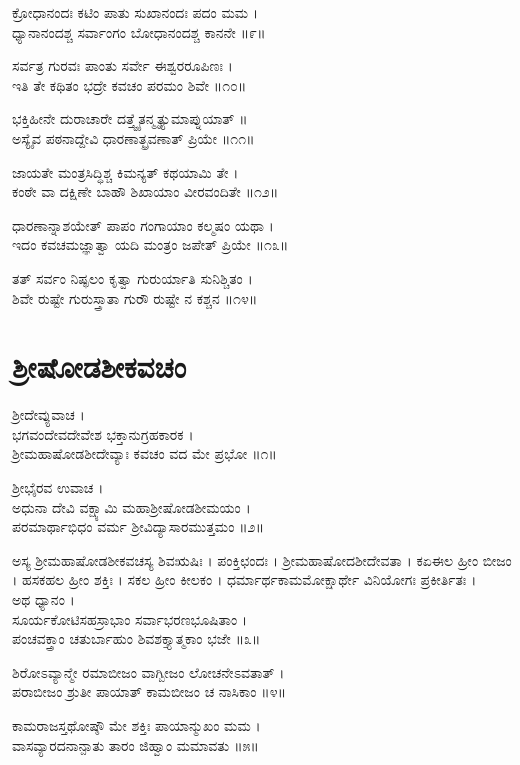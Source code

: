 ಕ್ರೋಧಾನಂದಃ ಕಟಿಂ ಪಾತು ಸುಖಾನಂದಃ ಪದಂ ಮಮ ।\\
ಧ್ಯಾನಾನಂದಶ್ಚ ಸರ್ವಾಂಗಂ ಬೋಧಾನಂದಶ್ಚ ಕಾನನೇ ॥೯॥

ಸರ್ವತ್ರ ಗುರವಃ ಪಾಂತು ಸರ್ವೇ ಈಶ್ವರರೂಪಿಣಃ ।\\
ಇತಿ ತೇ ಕಥಿತಂ ಭದ್ರೇ  ಕವಚಂ ಪರಮಂ ಶಿವೇ  ॥೧೦॥

ಭಕ್ತಿಹೀನೇ ದುರಾಚಾರೇ ದತ್ತ್ವೈತನ್ಮೃತ್ಯುಮಾಪ್ನುಯಾತ್ ॥\\
ಅಸ್ಯೈವ ಪಠನಾದ್ದೇವಿ  ಧಾರಣಾತ್ಛ್ರವಣಾತ್ ಪ್ರಿಯೇ  ॥೧೧॥

ಜಾಯತೇ ಮಂತ್ರಸಿದ್ಧಿಶ್ಚ ಕಿಮನ್ಯತ್ ಕಥಯಾಮಿ ತೇ ।\\
ಕಂಠೇ ವಾ ದಕ್ಷಿಣೇ ಬಾಹೌ ಶಿಖಾಯಾಂ ವೀರವಂದಿತೇ  ॥೧೨॥

ಧಾರಣಾನ್ನಾಶಯೇತ್ ಪಾಪಂ ಗಂಗಾಯಾಂ ಕಲ್ಮಷಂ ಯಥಾ ।\\
ಇದಂ ಕವಚಮಜ್ಞಾತ್ವಾ ಯದಿ ಮಂತ್ರಂ ಜಪೇತ್ ಪ್ರಿಯೇ  ॥೧೩॥

ತತ್ ಸರ್ವಂ ನಿಷ್ಫಲಂ ಕೃತ್ವಾ ಗುರುರ್ಯಾತಿ ಸುನಿಶ್ಚಿತಂ ।\\
ಶಿವೇ ರುಷ್ಟೇ ಗುರುಸ್ತ್ರಾತಾ ಗುರೌ ರುಷ್ಟೇ ನ ಕಶ್ಚನ ॥೧೪॥

\newpage
\section{ಶ್ರೀಷೋಡಶೀಕವಚಂ}
ಶ್ರೀದೇವ್ಯುವಾಚ ।\\
ಭಗವಂದೇವದೇವೇಶ ಭಕ್ತಾನುಗ್ರಹಕಾರಕ ।\\
ಶ್ರೀಮಹಾಷೋಡಶೀದೇವ್ಯಾಃ ಕವಚಂ ವದ ಮೇ ಪ್ರಭೋ ॥೧॥

ಶ್ರೀಭೈರವ ಉವಾಚ ।\\
ಅಧುನಾ ದೇವಿ ವಕ್ಷ್ಯಾಮಿ ಮಹಾಶ್ರೀಷೋಡಶೀಮಯಂ ।\\
ಪರಮಾರ್ಥಾಭಿಧಂ ವರ್ಮ ಶ್ರೀವಿದ್ಯಾಸಾರಮುತ್ತಮಂ ॥೨॥

ಅಸ್ಯ ಶ್ರೀಮಹಾಷೋಡಶೀಕವಚಸ್ಯ ಶಿವಋಷಿಃ । ಪಂಕ್ತಿಛಂದಃ । ಶ್ರೀಮಹಾಷೋದಶೀದೇವತಾ । ಕಏಈಲ ಹ್ರೀಂ ಬೀಜಂ । ಹಸಕಹಲ ಹ್ರೀಂ ಶಕ್ತಿಃ । ಸಕಲ ಹ್ರೀಂ ಕೀಲಕಂ । ಧರ್ಮಾರ್ಥಕಾಮಮೋಕ್ಷಾರ್ಥೇ ವಿನಿಯೋಗಃ ಪ್ರಕೀರ್ತಿತಃ ।\\

ಅಥ ಧ್ಯಾನಂ ।\\
ಸೂರ್ಯಕೋಟಿಸಹಸ್ರಾಭಾಂ ಸರ್ವಾಭರಣಭೂಷಿತಾಂ ।\\
ಪಂಚವಕ್ತ್ರಾಂ ಚತುರ್ಬಾಹುಂ ಶಿವಶಕ್ತ್ಯಾತ್ಮಕಾಂ ಭಜೇ ॥೩॥

ಶಿರೋಽವ್ಯಾನ್ಮೇ ರಮಾಬೀಜಂ ವಾಗ್ಬೀಜಂ ಲೋಚನೇಽವತಾತ್ ।\\
ಪರಾಬೀಜಂ ಶ್ರುತೀ ಪಾಯಾತ್ ಕಾಮಬೀಜಂ ಚ ನಾಸಿಕಾಂ ॥೪॥

ಕಾಮರಾಜಸ್ತಥೋಷ್ಠೌ ಮೇ ಶಕ್ತಿಃ ಪಾಯಾನ್ಮುಖಂ ಮಮ ।\\
ವಾಸವ್ಯಾರದನಾನ್ಪಾತು ತಾರಂ ಜಿಹ್ವಾಂ ಮಮಾವತು ॥೫॥

